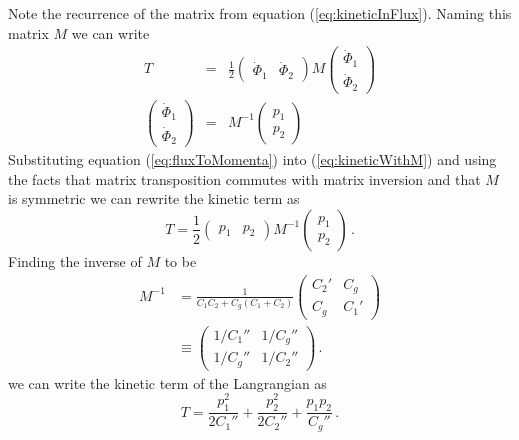 Note the recurrence of the matrix from equation (\ref{eq:kineticInFlux}). Naming this matrix $M$ we can write \begin{eqnarray}
T &=& \frac{1}{2}
      \left( \begin{array}{cc} \dot{\Phi}_1&\dot{\Phi}_2 \end{array} \right)
      M
      \left( \begin{array}{c} \dot{\Phi}_1 \\ \dot{\Phi}_2 \end{array} \right) \label{eq:kineticWithM} \\
\left( \begin{array}{c} \dot{\Phi}_1 \\ \dot{\Phi}_2 \end{array} \right) &=& M^{-1} \left( \begin{array}{c} p_1 \\ p_2 \end{array} \right) \label{eq:fluxToMomenta} \end{eqnarray}
Substituting equation (\ref{eq:fluxToMomenta}) into (\ref{eq:kineticWithM}) and using the facts that matrix transposition commutes with matrix inversion and that $M$ is symmetric we can rewrite the kinetic term as
\begin{equation}
T = \frac{1}{2} \left( \begin{array}{cc} p_1&p_2 \end{array} \right) M^{-1} \left( \begin{array}{c} p_1 \\ p_2 \end{array} \right) \, .
\end{equation}
Finding the inverse of $M$ to be
\begin{align}
M^{-1} &= \frac{1}{C_1C_2 + C_g(C_1 + C_2)} \left( \begin{array}{cc} C_2' & C_g \\ C_g & C_1' \end{array} \right) \nonumber \\
&\equiv \left( \begin{array}{cc} 1/C_1'' & 1/C_g'' \\ 1/C_g'' & 1/C_2'' \end{array} \right) \, .
\end{align}
we can write the kinetic term of the Langrangian as
  \begin{equation}
T = \frac{p_1^2}{2C_1''} + \frac{p_2^2}{2C_2''} + \frac{p_1p_2}{C_g''} \, . \label{eq:kineticInP}
\end{equation}

